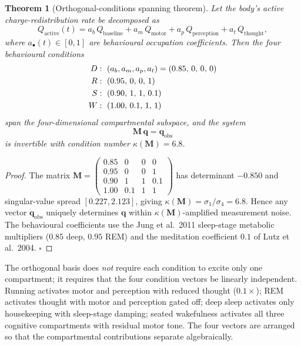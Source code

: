 \documentclass[11pt,twocolumn,a4paper]{article}
\newtheorem{theorem}{Theorem}[section]
\theoremstyle{definition}
\theoremstyle{remark}
\newcommand{\Qth}{Q_{\mathrm{thought}}}
\newcommand{\Qmo}{Q_{\mathrm{motor}}}
\newcommand{\Qpe}{Q_{\mathrm{perception}}}
\newcommand{\Qba}{Q_{\mathrm{baseline}}}
\begin{document}
\begin{theorem}[Orthogonal-conditions spanning theorem]
\label{thm:orth}
Let the body's active charge-redistribution rate be decomposed as
\begin{equation}
Q_{\mathrm{active}}(t) = a_b\,\Qba + a_m\,\Qmo + a_p\,\Qpe + a_t\,\Qth,
\end{equation}
where $a_\bullet(t)\in[0,1]$ are behavioural occupation coefficients.
Then the four behavioural conditions
\begin{align}
 D &:\ (a_b,a_m,a_p,a_t) = (0.85,\,0,\,0,\,0) \notag\\
 R &:\ (0.95,\,0,\,0,\,1) \notag\\
 S &:\ (0.90,\,1,\,1,\,0.1) \notag\\
 W &:\ (1.00,\,0.1,\,1,\,1) \notag
\end{align}
span the four-dimensional compartmental subspace, and the system
\begin{equation}
\mathbf{M}\,\mathbf{q} = \mathbf{q}_{\mathrm{obs}}
\end{equation}
is invertible with condition number $\kappa(\mathbf{M})=6.8$.
\end{theorem}

\begin{proof}
The matrix
$\mathbf{M} = \begin{pmatrix}0.85 & 0 & 0 & 0\\0.95 & 0 & 0 & 1\\0.90 & 1 & 1 & 0.1\\1.00 & 0.1 & 1 & 1\end{pmatrix}$
has determinant $-0.850$ and singular-value spread $[0.227, 2.123]$,
giving $\kappa(\mathbf{M})=\sigma_1/\sigma_4=6.8$. Hence any vector
$\mathbf{q}_{\mathrm{obs}}$ uniquely determines $\mathbf{q}$ within
$\kappa(\mathbf{M})$-amplified measurement noise. The behavioural
coefficients use the Jung et al.\ 2011 sleep-stage metabolic
multipliers ($0.85$ deep, $0.95$ REM) and the meditation coefficient
$0.1$ of Lutz et al.\ 2004. $\square$
\end{proof}

The orthogonal basis does \emph{not} require each condition to excite
only one compartment; it requires that the four condition vectors be
linearly independent. Running activates motor and perception with
reduced thought ($0.1\times$); REM activates thought with
motor and perception gated off; deep sleep activates only housekeeping
with sleep-stage damping; seated wakefulness activates all three
cognitive compartments with residual motor tone. The four vectors are
arranged so that the compartmental contributions separate
algebraically.
\end{document}
